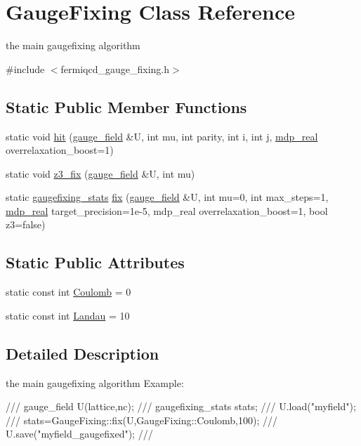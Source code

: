 \hypertarget{class_gauge_fixing}{
\section{GaugeFixing Class Reference}
\label{class_gauge_fixing}
}


the main gaugefixing algorithm  


{\ttfamily \#include $<$fermiqcd\_\-gauge\_\-fixing.h$>$}\subsection*{Static Public Member Functions}
\begin{DoxyCompactItemize}
\item 
static void \hyperlink{class_gauge_fixing_a19a0c4aeaa7caa8468d702238d223e0a}{hit} (\hyperlink{classgauge__field}{gauge\_\-field} \&U, int mu, int parity, int i, int j, \hyperlink{mdp__global__vars_8h_a049e4c1d4e74d644878a42f9909463e4}{mdp\_\-real} overrelaxation\_\-boost=1)
\item 
static void \hyperlink{class_gauge_fixing_af3a79f5db7d5c4cef7074938578eff80}{z3\_\-fix} (\hyperlink{classgauge__field}{gauge\_\-field} \&U, int mu)
\item 
static \hyperlink{classgaugefixing__stats}{gaugefixing\_\-stats} \hyperlink{class_gauge_fixing_a71359f7c7bd14c3c5d548cbf7e6793c5}{fix} (\hyperlink{classgauge__field}{gauge\_\-field} \&U, int mu=0, int max\_\-steps=1, \hyperlink{mdp__global__vars_8h_a049e4c1d4e74d644878a42f9909463e4}{mdp\_\-real} target\_\-precision=1e-\/5, mdp\_\-real overrelaxation\_\-boost=1, bool z3=false)
\end{DoxyCompactItemize}
\subsection*{Static Public Attributes}
\begin{DoxyCompactItemize}
\item 
static const int \hyperlink{class_gauge_fixing_a8be5d99ab21951db104df17ffdd7362f}{Coulomb} = 0
\item 
static const int \hyperlink{class_gauge_fixing_a115e0b47731237fd9ff984c7f6881994}{Landau} = 10
\end{DoxyCompactItemize}


\subsection{Detailed Description}
the main gaugefixing algorithm Example: \begin{DoxyVerb}
///    gauge_field U(lattice,nc);
///    gaugefixing_stats stats;
///    U.load("myfield");
///    stats=GaugeFixing::fix(U,GaugeFixing::Coulomb,100);
///    U.save("myfield_gaugefixed");
/// \end{DoxyVerb}
 

